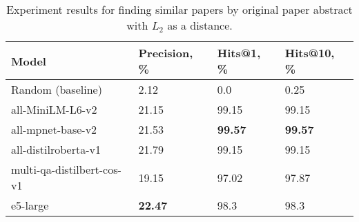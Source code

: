 \begin{table*}
    \small
    \centering
    \caption{Experiment results for finding similar papers by original paper abstract with \(L_{2}\) as a distance.}
    \bigskip
    \begin{tabularx}{0.99\textwidth}{XIII}

        \toprule

        \bfseries Model & \bfseries Precision, \% & \bfseries Hits@1, \% & \bfseries Hits@10, \% \\

        \midrule
        
        Random (baseline)		                & 2.12  &  0.0 	&    0.25 \\
        
        \midrule
        
        all-MiniLM-L6-v2	        & 21.15 & 99.15	   &	99.15 \\
        all-mpnet-base-v2	        & 21.53 & \bfseries 99.57 &	\bfseries 99.57 \\
        all-distilroberta-v1	    & 21.79 & 99.15	   &	99.15 \\
        multi-qa-distilbert-cos-v1	& 19.15 & 97.02	   &	97.87 \\
        e5-large	                & \bfseries 22.47 & 98.3 	   &	98.3 \\

        \bottomrule

    \end{tabularx}

    \label{tab:experiments:abs-l2}
\end{table*}


